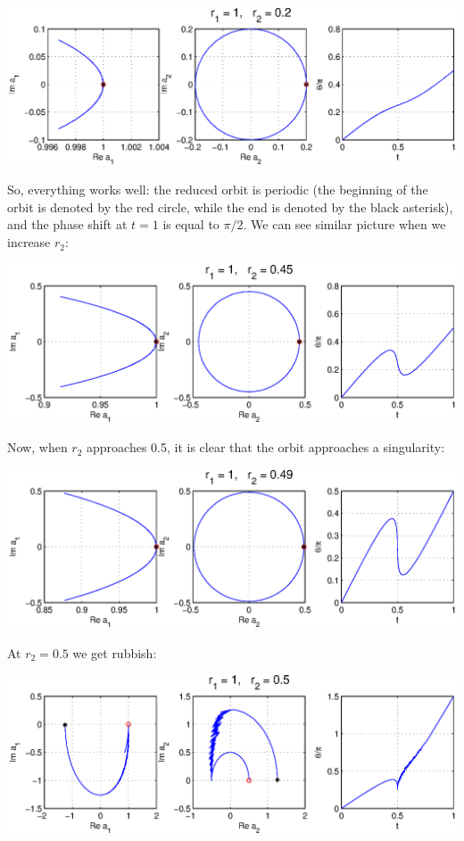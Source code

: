\vspace{2ex}\noindent\includegraphics[width=\textwidth]{sliceflow1}

So, everything works well: the reduced orbit is periodic (the beginning of the orbit is denoted by the red circle, while the end is denoted by the black asterisk), and the phase shift at $t = 1$ is equal to $\pi/2$.  We can see similar picture when we increase $r_2$:

\vspace{2ex}\noindent\includegraphics[width=\textwidth]{sliceflow2}

Now, when $r_2$ approaches 0.5, it is clear that the orbit approaches a singularity:

\vspace{2ex}\noindent\includegraphics[width=\textwidth]{sliceflow3}

At $r_2 = 0.5$ we get rubbish:

\vspace{2ex}\noindent\includegraphics[width=\textwidth]{sliceflow4}

